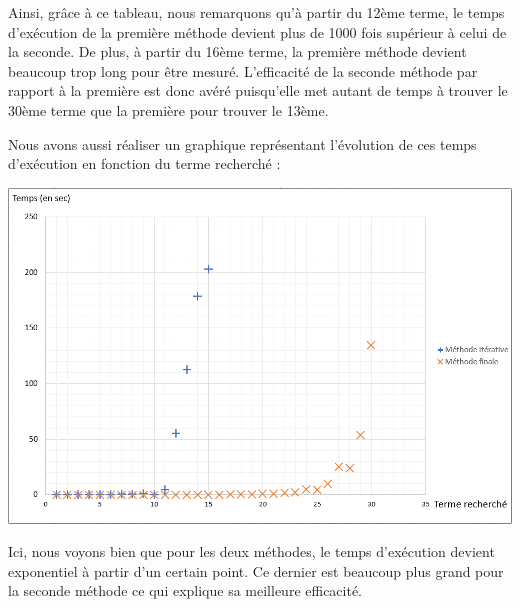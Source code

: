 \documentclass{article}
\begin{document}
Ainsi, grâce à ce tableau, nous remarquons qu'à partir du 12ème terme, le temps d'exécution de la première méthode devient plus de 1000 fois supérieur à celui de la seconde. De plus, à partir du 16ème terme, la première méthode devient beaucoup trop long pour être mesuré. L'efficacité de la seconde méthode par rapport à la première est donc avéré puisqu'elle met autant de temps à trouver le 30ème terme que la première pour trouver le 13ème.

Nous avons aussi réaliser un graphique représentant l'évolution de ces temps d'exécution en fonction du terme recherché :

\bigbreak
\includegraphics[scale = 0.5]{Graphe.png}
\bigbreak

Ici, nous voyons bien que pour les deux méthodes, le temps d'exécution devient exponentiel à partir d'un certain point. Ce dernier est beaucoup plus grand pour la seconde méthode ce qui explique sa meilleure efficacité.

\begin{appendix}

\end{appendix}
\end{document}
